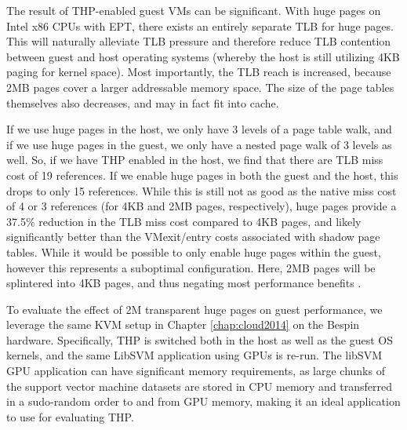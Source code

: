 The result of THP-enabled guest VMs can be significant. With huge pages on Intel x86 CPUs with EPT, there exists an entirely separate TLB for huge pages. This will naturally alleviate TLB pressure and therefore reduce TLB contention between guest and host operating systems (whereby the host is still utilizing 4KB paging for kernel space). Most importantly, the TLB reach is increased, because 2MB pages cover a larger addressable memory space.  The size of the page tables themselves also decreases, and may in fact fit into cache.  

If we use huge pages in the host, we only have 3 levels of a page table walk, and if we use huge pages in the guest, we only have a nested page walk of 3 levels as well. So, if we have THP enabled in the host, we find that there are TLB miss cost of 19 references.  If we enable huge pages in both the  guest and the host, this drops to only 15 references.  While this is still not as good as the native miss cost of 4 or 3 references (for 4KB and 2MB pages, respectively), huge pages provide a 37.5\% reduction in the TLB miss cost compared to 4KB pages, and likely significantly better than the VMexit/entry costs associated with shadow page tables.  While it would be possible to only enable huge pages within the guest, however this represents a suboptimal configuration. Here, 2MB pages will be splintered into 4KB pages, and thus negating most performance benefits \cite{pham2015splintering}. 


To evaluate the effect of 2M transparent huge pages on guest performance, we leverage the same KVM setup in Chapter \ref{chap:cloud2014} on the Bespin hardware. Specifically, THP is switched both in the host as well as the guest OS kernels, and the same LibSVM application using GPUs is re-run. The libSVM GPU application can have significant memory requirements, as large chunks of the support vector machine datasets are stored in CPU memory and transferred in a sudo-random order to and from GPU memory, making it an ideal application to use for evaluating THP.



